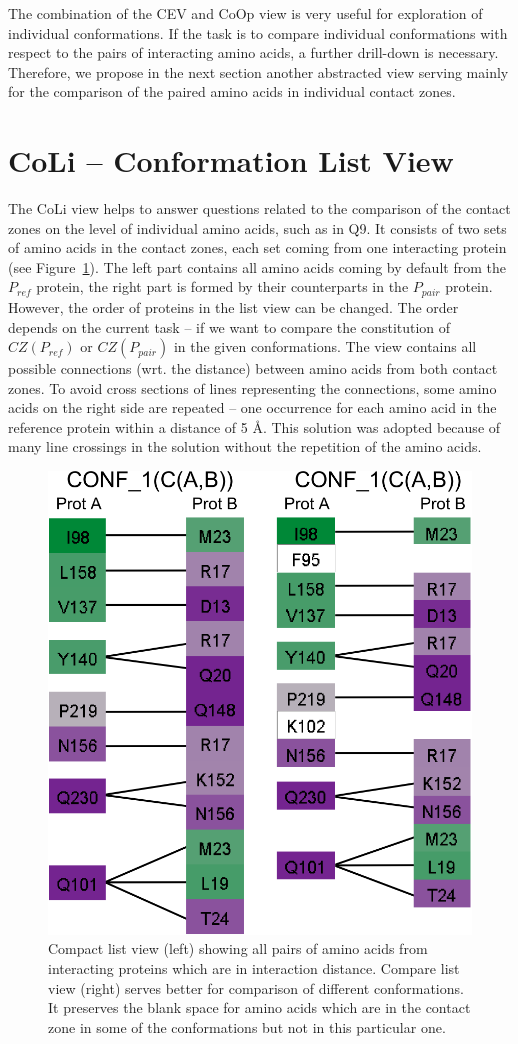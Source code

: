 \documentclass[journal]{vgtc}                %
\begin{document}
The combination of the CEV and CoOp view is very useful for exploration of individual conformations.
If the task is to compare individual conformations with respect to the pairs of interacting amino acids, a further drill-down is necessary.
Therefore, we propose in the next section another abstracted view serving mainly for the comparison of the paired amino acids in individual contact zones.

\section{CoLi -- Conformation List View}
The CoLi view helps to answer questions related to the comparison of the contact zones on the level of individual amino acids, such as in Q9.
It consists of two sets of amino acids in the contact zones, each set coming from one interacting protein (see Figure~\ref{fig:list}).
The left part contains all amino acids coming by default from the $P_{ref}$ protein, the right part is formed by their counterparts in the $P_{pair}$ protein.
However, the order of proteins in the list view can be changed.
The order depends on the current task -- if we want to compare the constitution of $CZ(P_{ref})$ or $CZ(P_{pair})$ in the given conformations.
The view contains all possible connections (wrt. the distance) between amino acids from both contact zones.
To avoid cross sections of lines representing the connections, some amino acids on the right side are repeated -- one occurrence for each amino acid in the reference protein within a distance of 5 \AA. 
This solution was adopted because of many line crossings in the solution without the repetition of the amino acids.

\begin{figure}[bt]
  \centering
  \includegraphics[width=0.7\columnwidth]{list.png}
  \caption{Compact list view (left) showing all pairs of amino acids from interacting proteins which are in interaction distance. Compare list view (right) serves better for comparison of different conformations. It preserves the blank space for amino acids which are in the contact zone in some of the conformations but not in this particular one.}
  \label{fig:list}
\end{figure}
\end{document}
